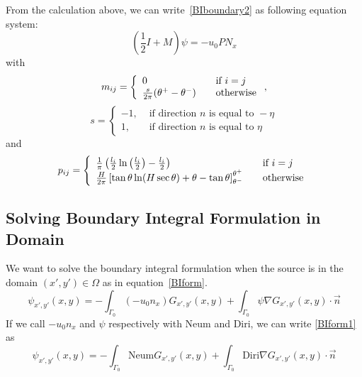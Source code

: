 \documentclass[a4paper,12pt]{article}
\newcommand{\integ}[3]{%
\ensuremath{\displaystyle{\int^{#2}_{#1} #3}}}
\begin{document}
From the calculation above, we can write~\eqref{BIboundary2} as following equation system:
\begin{equation}\label{SPL}
 \left( \frac{1}{2} I+M \right) \psi= -u_0 P N_x 
\end{equation}
with 
\[  m_{ij}= \left\{
  \begin{array}{l l}
    0 & \quad \text{if $i=j$ }\\
    \frac{s}{2\pi}(\theta^+-\theta^-) & \quad \text{otherwise}
  \end{array} \right.,\]
   \[
 s=\left\{ \begin{array}{ll}
    -1, & \text{ if direction } n \text{ is equal to }-\eta\\
    1, & \text{ if direction } n \text{ is equal to } \eta
   \end{array}\right.
\]
  and
  \[  p_{ij}= \left\{
  \begin{array}{l l}
     \frac{1}{\pi} \left( \frac{l_i}{2}\ln \left( \frac{l_i}{2} \right)-\frac{l_i}{2} \right) & \quad \text{if $i=j$ }\\
    \frac{H}{2\pi}\left [ \tan \theta \ln (H\sec\theta)+\theta-\tan\theta \right ]_{\theta^-}^{\theta^+} & \quad \text{otherwise}
  \end{array} \right.\]

  
\subsection{Solving Boundary Integral Formulation in Domain}

We want to solve the boundary integral formulation when the source is in the domain $(x',y')\in \Omega$ as in equation~\eqref{BIform}. 
\begin{equation}
 \psi_{x',y'}(x,y)=-\integ{\Gamma_0}{}{(-u_0 n_x)G_{x',y'}(x,y)} + \integ{\Gamma_0}{}{\psi\nabla G_{x',y'}(x,y)\cdot \vec{n}} \label{BIform1}
\end{equation}
If we call $-u_0 n_x$ and $\psi$ respectively with Neum and Diri, we can write \ref{BIform1} as
\begin{equation}
 \psi_{x',y'}(x,y)=-\integ{\Gamma_0}{}{\text{Neum}G_{x',y'}(x,y)} + \integ{\Gamma_0}{}{\text{Diri}\nabla G_{x',y'}(x,y)\cdot \vec{n}}
\end{equation}
\end{document}
